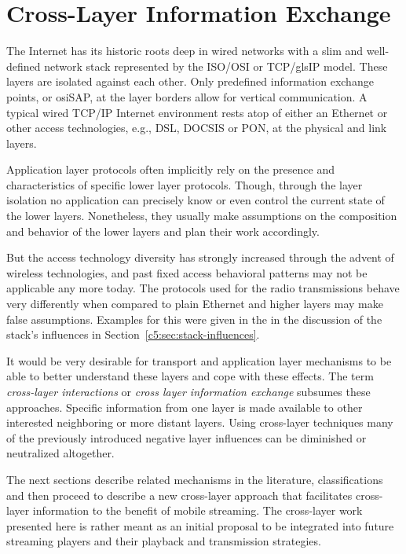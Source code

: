 \section{Cross-Layer Information Exchange}
\label{c5:sec:crosslayerhinting}

The Internet has its historic roots deep in wired networks with a slim and well-defined network stack represented by the \gls{ISO}/\gls{OSI} or \gls{TCP}/gls{IP} model. These layers are isolated against each other. Only predefined information exchange points, or \gls{osiSAP}, at the layer borders allow for vertical communication. A typical wired \gls{TCP}/\gls{IP} Internet environment rests atop of either an Ethernet or other access technologies, e.g., \acrshort{DSL}, \acrshort{DOCSIS} or \acrshort{PON}, at the physical and link layers.

Application layer protocols often implicitly rely on the presence and characteristics of specific lower layer protocols. Though, through the layer isolation no application can precisely know or even control the current state of the lower layers. Nonetheless, they usually make assumptions on the composition and behavior of the lower layers and plan their work accordingly. 

But the access technology diversity has strongly increased through the advent of wireless technologies, and past fixed access behavioral patterns may not be applicable any more today. The protocols used for the radio transmissions behave very differently when compared to plain Ethernet and higher layers may make false assumptions. Examples for this were given in the in the discussion of the stack's influences in Section~\ref{c5:sec:stack-influences}.

It would be very desirable for transport and application layer mechanisms to be able to better understand these layers and cope with these effects. The term \textit{cross-layer interactions} or \textit{cross layer information exchange} subsumes these approaches. Specific information from one layer is made available to other interested neighboring or more distant layers. Using cross-layer techniques many of the previously introduced negative layer influences can be diminished or neutralized altogether.

The next sections describe related mechanisms in the literature, classifications and then proceed to describe a new cross-layer approach that facilitates cross-layer information to the benefit of mobile streaming. The cross-layer work presented here is rather meant as an initial proposal to be integrated into future streaming players and their playback and transmission strategies.


